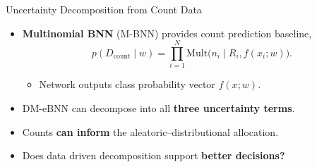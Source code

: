 \begin{frame}{Uncertainty Decomposition from Count Data}
\label{frm:count-allocation-results}
\setlength{\abovedisplayskip}{2pt}
\setlength{\belowdisplayskip}{2pt}
\setlength{\abovedisplayshortskip}{2pt}
\setlength{\belowdisplayshortskip}{2pt}
\begin{itemize}
\item \textbf{Multinomial BNN} (M-BNN) provides count prediction baseline,
\[
p(D_{\mathrm{count}}\mid w)
=\prod_{i=1}^{N}\mathrm{Mult}\bigl(n_i\mid R_i,f(x_i;w)\bigr).
\]
\begin{itemize}
\setlength{\topsep}{0pt}
\setlength{\partopsep}{0pt}
\setlength{\parsep}{0pt}
\setlength{\itemsep}{0pt}
\item Network outputs class probability vector $f(x;w)$.
\end{itemize}
\end{itemize}
\par\vspace{5mm}
{\centering
\small
\setlength{\tabcolsep}{5pt}
\renewcommand{\arraystretch}{1.25}
\par}
\vspace{3mm}
\begin{itemize}
\setlength{\itemsep}{1mm}
\item<2-> DM-eBNN can decompose into all \textbf{three uncertainty terms}.
\item<2-> Counts \textbf{can inform} the aleatoric--distributional allocation.
\item<2-> Does data driven decomposition support \textbf{better decisions?}
\end{itemize}
\end{frame}


